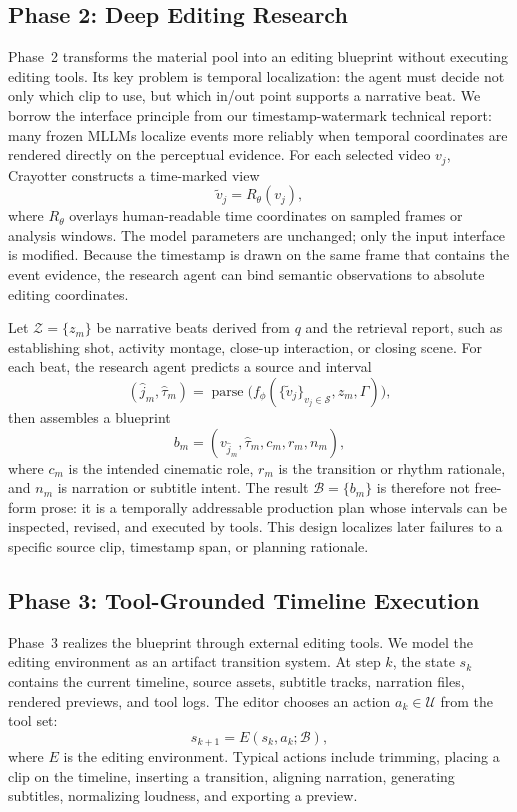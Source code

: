 ﻿\documentclass[11pt]{article}
\begin{document}
\subsection{Phase 2: Deep Editing Research}

Phase~2 transforms the material pool into an editing blueprint without
executing editing tools. Its key problem is temporal localization: the agent
must decide not only which clip to use, but which in/out point supports a
narrative beat. We borrow the interface principle from our timestamp-watermark
technical report: many frozen MLLMs localize events more reliably when temporal
coordinates are rendered directly on the perceptual evidence. For each selected
video $v_j$, Crayotter constructs a time-marked view
\[
    \tilde{v}_j = R_{\theta}(v_j),
\]
where $R_{\theta}$ overlays human-readable time coordinates on sampled frames
or analysis windows. The model parameters are unchanged; only the input
interface is modified. Because the timestamp is drawn on the same frame that
contains the event evidence, the research agent can bind semantic observations
to absolute editing coordinates.

Let $\mathcal{Z}=\{z_m\}$ be narrative beats derived from $q$ and the retrieval
report, such as establishing shot, activity montage, close-up interaction, or
closing scene. For each beat, the research agent predicts a source and interval
\[
    (\hat{j}_m,\hat{\tau}_m)
    = \operatorname{parse}
      \bigl(f_{\phi}(\{\tilde{v}_j\}_{v_j\in\mathcal{S}},z_m,\Gamma)\bigr),
\]
then assembles a blueprint
\[
    b_m=(v_{\hat{j}_m},\hat{\tau}_m,c_m,r_m,n_m),
\]
where $c_m$ is the intended cinematic role, $r_m$ is the transition or rhythm
rationale, and $n_m$ is narration or subtitle intent. The result
$\mathcal{B}=\{b_m\}$ is therefore not free-form prose: it is a temporally
addressable production plan whose intervals can be inspected, revised, and
executed by tools. This design localizes later failures to a specific source
clip, timestamp span, or planning rationale.

\subsection{Phase 3: Tool-Grounded Timeline Execution}

Phase~3 realizes the blueprint through external editing tools. We model the
editing environment as an artifact transition system. At step $k$, the state
$s_k$ contains the current timeline, source assets, subtitle tracks, narration
files, rendered previews, and tool logs. The editor chooses an action
$a_k\in\mathcal{U}$ from the tool set:
\[
    s_{k+1}=E(s_k,a_k;\mathcal{B}),
\]
where $E$ is the editing environment. Typical actions include trimming,
placing a clip on the timeline, inserting a transition, aligning narration,
generating subtitles, normalizing loudness, and exporting a preview.
\end{document}
